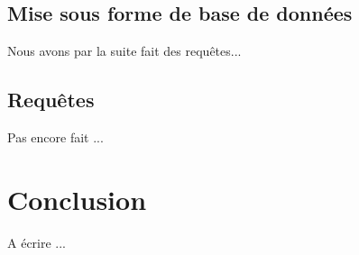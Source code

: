 \documentclass{article}
\begin{document}
\subsection{Mise sous forme de base de données}
Nous avons par la suite fait des requêtes...

\subsection{Requêtes}
Pas encore fait ...

\section{Conclusion}
A écrire ...
\end{document}
